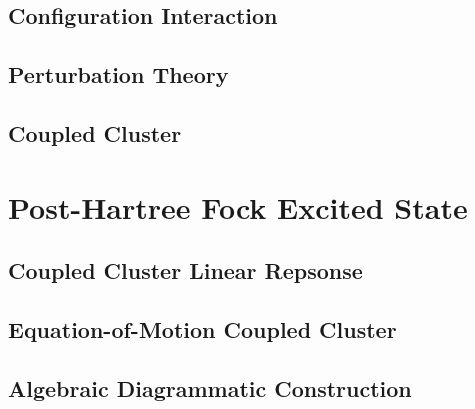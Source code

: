 \subsection{Configuration Interaction}

\subsection{Perturbation Theory}

\subsection{Coupled Cluster}

\section{Post-Hartree Fock Excited State}

\subsection{Coupled Cluster Linear Repsonse}

\subsection{Equation-of-Motion Coupled Cluster}

\subsection{Algebraic Diagrammatic Construction}
